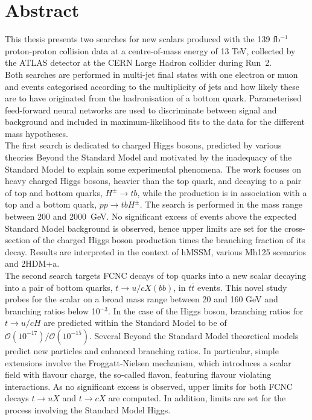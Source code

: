 \chapter*{Abstract}


This thesis presents two searches for new scalars produced with the 139 fb$^{-1}$ proton-proton collision data at a centre-of-mass energy of 13 TeV, collected by the ATLAS detector at the CERN Large Hadron collider during Run~2.\\

Both searches are performed in multi-jet final states with one electron or muon and events categorised according to the multiplicity of jets and how likely these are to have originated from the hadronisation of a bottom quark. Parameterised feed-forward neural networks are used to discriminate between signal and background and included in maximum-likelihood fits to the data for the different mass hypotheses.\\

The first search is dedicated to charged Higgs bosons, predicted by various theories Beyond the Standard Model and motivated by the inadequacy of the Standard Model to explain some experimental phenomena. The work focuses on heavy charged Higgs bosons, heavier than the top quark, and decaying to a pair of top and bottom quarks, $H^\pm\to tb$, while the production is in association with a top and a bottom quark, $pp\to tbH^\pm$. The search is performed in the mass range between 200 and 2000~GeV. No significant excess of events above the expected Standard Model background is observed, hence upper limits are set for the cross-section of the charged Higgs boson production times the branching fraction of its decay. Results are interpreted in the context of hMSSM, various Mh125 scenarios and 2HDM+a.\\

The second search targets FCNC decays of top quarks into a new scalar decaying into a pair of bottom quarks, $t \to u/c X(bb)$, in $t\bar{t}$ events. This novel study probes for the scalar on a broad mass range between 20 and 160 GeV and branching ratios below 10$^{-3}$. In the case of the Higgs boson, branching ratios for $t \to u/c H$ are predicted within the Standard Model to be of $\mathcal{O}(10^{-17})/\mathcal{O}(10^{-15})$. Several Beyond the Standard Model theoretical models predict new particles and enhanced branching ratios. In particular, simple extensions involve the Froggatt-Nielsen mechanism, which introduces a scalar field with flavour charge, the so-called flavon, featuring flavour violating interactions. As no significant excess is observed, upper limits for both FCNC decays $t\to uX$ and $t\to cX$ are computed. In addition, limits are set for the process involving the Standard Model Higgs.